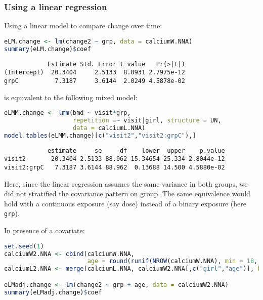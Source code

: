 \documentclass[12pt]{article}
\begin{document}
\clearpage
\subsubsection{Using a linear regression}
\label{sec:org975ac6e}

Using a linear model to compare change over time:
\begin{lstlisting}[language=r,numbers=none]
eLM.change <- lm(change2 ~ grp, data = calciumW.NNA)
summary(eLM.change)$coef
\end{lstlisting}

\label{}
\begin{verbatim}
            Estimate Std. Error t value   Pr(>|t|)
(Intercept)  20.3404     2.5133  8.0931 2.7975e-12
grpC          7.3187     3.6144  2.0249 4.5878e-02
\end{verbatim}


is equivalent to the following mixed model:
\begin{lstlisting}[language=r,numbers=none]
eLMM.change <- lmm(bmd ~ visit*grp,
                   repetition =~ visit|girl, structure = UN,
                   data = calciumL.NNA)
model.tables(eLMM.change)[c("visit2","visit2:grpC"),]
\end{lstlisting}

\label{}
\begin{verbatim}
            estimate     se     df    lower  upper    p.value
visit2       20.3404 2.5133 88.962 15.34654 25.334 2.8044e-12
visit2:grpC   7.3187 3.6144 88.962  0.13688 14.500 4.5880e-02
\end{verbatim}


Here, since the linear regression assumes the same variance in both
groups, we did not stratified the covariance pattern on group. The
same equivalence would hold with a continuous exposure (say dose)
instead of a binary exposure (here \texttt{grp}).

\bigskip

In presence of a covariate:
\begin{lstlisting}[language=r,numbers=none]
set.seed(1)
calciumW2.NNA <- cbind(calciumW.NNA,
                       age = round(runif(NROW(calciumW.NNA), min = 18, max = 60)))
calciumL2.NNA <- merge(calciumL.NNA, calciumW2.NNA[,c("girl","age")], by = "girl")

eLMadj.change <- lm(change2 ~ grp + age, data = calciumW2.NNA)
summary(eLMadj.change)$coef
\end{lstlisting}
\end{document}

